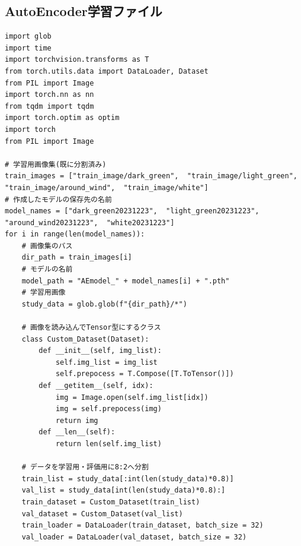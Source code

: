 \documentclass[dvipdfmx]{jsarticle}
\begin{document}
\subsection{AutoEncoder学習ファイル}\label{file4}
\begin{lstlisting}
import glob
import time
import torchvision.transforms as T
from torch.utils.data import DataLoader, Dataset
from PIL import Image
import torch.nn as nn
from tqdm import tqdm
import torch.optim as optim
import torch
from PIL import Image

# 学習用画像集(既に分割済み)
train_images = ["train_image/dark_green",  "train_image/light_green",  "train_image/around_wind",  "train_image/white"]
# 作成したモデルの保存先の名前
model_names = ["dark_green20231223",  "light_green20231223",  "around_wind20231223",  "white20231223"]
for i in range(len(model_names)):
    # 画像集のパス
    dir_path = train_images[i]
    # モデルの名前
    model_path = "AEmodel_" + model_names[i] + ".pth"
    # 学習用画像
    study_data = glob.glob(f"{dir_path}/*")

    # 画像を読み込んでTensor型にするクラス
    class Custom_Dataset(Dataset):
        def __init__(self, img_list):
            self.img_list = img_list
            self.prepocess = T.Compose([T.ToTensor()])
        def __getitem__(self, idx):
            img = Image.open(self.img_list[idx])
            img = self.prepocess(img)
            return img
        def __len__(self):
            return len(self.img_list)
    
    # データを学習用・評価用に8:2へ分割
    train_list = study_data[:int(len(study_data)*0.8)]
    val_list = study_data[int(len(study_data)*0.8):]
    train_dataset = Custom_Dataset(train_list)
    val_dataset = Custom_Dataset(val_list)
    train_loader = DataLoader(train_dataset, batch_size = 32)
    val_loader = DataLoader(val_dataset, batch_size = 32)


\end{lstlisting}
\end{document}
